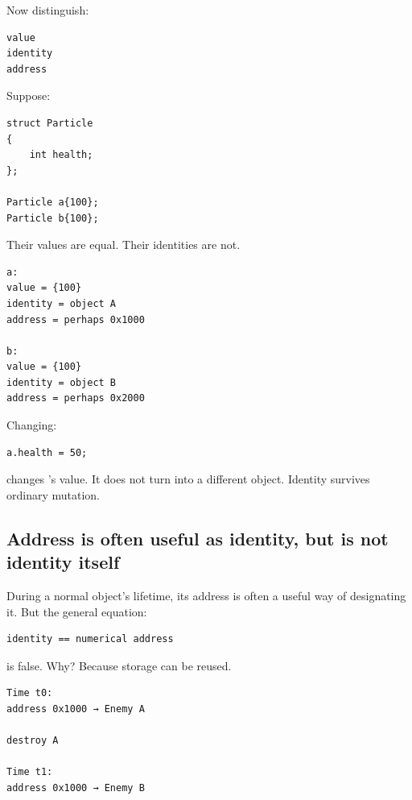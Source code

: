 Now distinguish:

\begin{verbatim}
value
identity
address
\end{verbatim}

Suppose:

\begin{verbatim}
struct Particle
{
    int health;
};

Particle a{100};
Particle b{100};
\end{verbatim}

Their values are equal. Their identities are not.

\begin{verbatim}
a:
value = {100}
identity = object A
address = perhaps 0x1000

b:
value = {100}
identity = object B
address = perhaps 0x2000
\end{verbatim}

Changing:

\begin{verbatim}
a.health = 50;
\end{verbatim}

changes 's value. It does not turn  into a different object. Identity survives ordinary mutation.

\subsection{Address is often useful as identity, but is not identity itself}\label{01-foundations-i-ch002-address-is-often-useful-as-identity-but-is-not-identity-itself}

\hypertarget{01-foundations-i-ch002-address-is-often-useful-as-identity-but-is-not-identity-itself}{}

During a normal object's lifetime, its address is often a useful way of designating it. But the general equation:

\begin{verbatim}
identity == numerical address
\end{verbatim}

is false. Why? Because storage can be reused.

\begin{verbatim}
Time t0:
address 0x1000 → Enemy A

destroy A

Time t1:
address 0x1000 → Enemy B
\end{verbatim}

